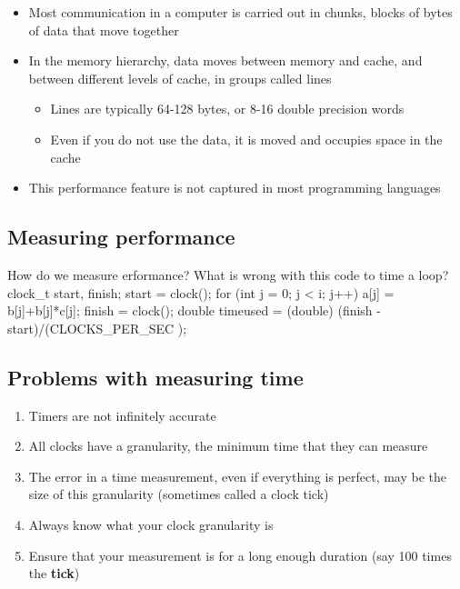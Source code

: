 \documentclass[%
oneside,                 %
final,                   %
10pt]{article}
\begin{document}
\begin{itemize}
\item Most communication in a computer is carried out in chunks, blocks of bytes of data that move together

\item In the memory hierarchy, data moves between memory and cache, and between different levels of cache, in groups called lines
\begin{itemize}

 \item Lines are typically 64-128 bytes, or 8-16 double precision words

 \item Even if you do not use the data, it is moved and occupies space in the cache

\end{itemize}

\noindent
\item This performance feature is not captured in most programming languages
\end{itemize}

\noindent
\subsection{Measuring performance}

How do we measure erformance? What is wrong with this code to time a loop?
\bccq
  clock_t start, finish;
  start = clock();
  for (int j = 0; j < i; j++) {
    a[j] = b[j]+b[j]*c[j];
  }
  finish = clock();
  double timeused = (double) (finish - start)/(CLOCKS_PER_SEC );
\eccq

\subsection{Problems with measuring time}
\begin{enumerate}
\item Timers are not infinitely accurate

\item All clocks have a granularity, the minimum time that they can measure

\item The error in a time measurement, even if everything is perfect, may be the size of this granularity (sometimes called a clock tick)

\item Always know what your clock granularity is

\item Ensure that your measurement is for a long enough duration (say 100 times the \textbf{tick})
\end{enumerate}
\end{document}
